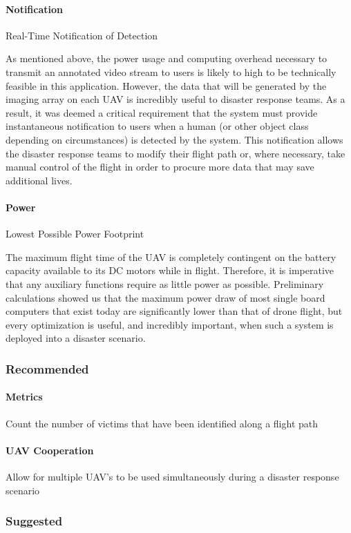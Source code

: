   \paragraph{Notification} Real-Time Notification of Detection

As mentioned above, the power usage and computing overhead necessary to transmit an annotated video stream to users is likely to high to be technically feasible in this application. However, the data that will be generated by the imaging array on each UAV is incredibly useful to disaster response teams. As a result, it was deemed a critical requirement that the system must provide instantaneous notification to users when a human (or other object class depending on circumstances) is detected by the system. This notification allows the disaster response teams to modify their flight path or, where necessary, take manual control of the flight in order to procure more data that may save additional lives.
  \paragraph{Power} Lowest Possible Power Footprint

The maximum flight time of the UAV is completely contingent on the battery capacity available to its DC motors while in flight. Therefore, it is imperative that any auxiliary functions require as little power as possible. Preliminary calculations showed us that the maximum power draw of most single board computers that exist today are significantly lower than that of drone flight, but every optimization is useful, and incredibly important, when such a system is deployed into a disaster scenario.
\subsubsection{Recommended}
  \paragraph{Metrics} Count the number of victims that have been identified along a flight path
  \paragraph{UAV Cooperation}

Allow for multiple UAV's to be used simultaneously during a disaster response scenario
\subsubsection{Suggested}

